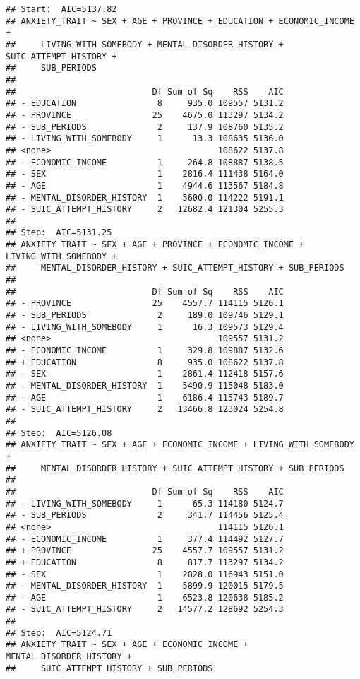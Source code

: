 \documentclass[
]{book}
\begin{document}
\begin{verbatim}
## Start:  AIC=5137.82
## ANXIETY_TRAIT ~ SEX + AGE + PROVINCE + EDUCATION + ECONOMIC_INCOME + 
##     LIVING_WITH_SOMEBODY + MENTAL_DISORDER_HISTORY + SUIC_ATTEMPT_HISTORY + 
##     SUB_PERIODS
## 
##                           Df Sum of Sq    RSS    AIC
## - EDUCATION                8     935.0 109557 5131.2
## - PROVINCE                25    4675.0 113297 5134.2
## - SUB_PERIODS              2     137.9 108760 5135.2
## - LIVING_WITH_SOMEBODY     1      13.3 108635 5136.0
## <none>                                 108622 5137.8
## - ECONOMIC_INCOME          1     264.8 108887 5138.5
## - SEX                      1    2816.4 111438 5164.0
## - AGE                      1    4944.6 113567 5184.8
## - MENTAL_DISORDER_HISTORY  1    5600.0 114222 5191.1
## - SUIC_ATTEMPT_HISTORY     2   12682.4 121304 5255.3
## 
## Step:  AIC=5131.25
## ANXIETY_TRAIT ~ SEX + AGE + PROVINCE + ECONOMIC_INCOME + LIVING_WITH_SOMEBODY + 
##     MENTAL_DISORDER_HISTORY + SUIC_ATTEMPT_HISTORY + SUB_PERIODS
## 
##                           Df Sum of Sq    RSS    AIC
## - PROVINCE                25    4557.7 114115 5126.1
## - SUB_PERIODS              2     189.0 109746 5129.1
## - LIVING_WITH_SOMEBODY     1      16.3 109573 5129.4
## <none>                                 109557 5131.2
## - ECONOMIC_INCOME          1     329.8 109887 5132.6
## + EDUCATION                8     935.0 108622 5137.8
## - SEX                      1    2861.4 112418 5157.6
## - MENTAL_DISORDER_HISTORY  1    5490.9 115048 5183.0
## - AGE                      1    6186.4 115743 5189.7
## - SUIC_ATTEMPT_HISTORY     2   13466.8 123024 5254.8
## 
## Step:  AIC=5126.08
## ANXIETY_TRAIT ~ SEX + AGE + ECONOMIC_INCOME + LIVING_WITH_SOMEBODY + 
##     MENTAL_DISORDER_HISTORY + SUIC_ATTEMPT_HISTORY + SUB_PERIODS
## 
##                           Df Sum of Sq    RSS    AIC
## - LIVING_WITH_SOMEBODY     1      65.3 114180 5124.7
## - SUB_PERIODS              2     341.7 114456 5125.4
## <none>                                 114115 5126.1
## - ECONOMIC_INCOME          1     377.4 114492 5127.7
## + PROVINCE                25    4557.7 109557 5131.2
## + EDUCATION                8     817.7 113297 5134.2
## - SEX                      1    2828.0 116943 5151.0
## - MENTAL_DISORDER_HISTORY  1    5899.9 120015 5179.5
## - AGE                      1    6523.8 120638 5185.2
## - SUIC_ATTEMPT_HISTORY     2   14577.2 128692 5254.3
## 
## Step:  AIC=5124.71
## ANXIETY_TRAIT ~ SEX + AGE + ECONOMIC_INCOME + MENTAL_DISORDER_HISTORY + 
##     SUIC_ATTEMPT_HISTORY + SUB_PERIODS

\end{verbatim}
\end{document}
